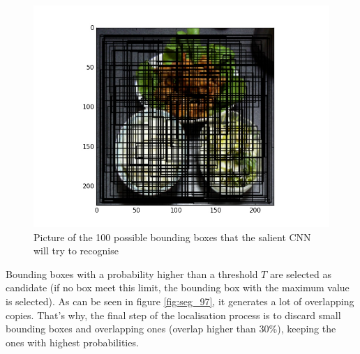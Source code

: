 \begin{figure}
    \centering
    \includegraphics[scale=0.5]{img/seg_100_bboxes.jpg}
    \caption{Picture of the 100 possible bounding boxes that the salient CNN will try to recognise}
    \label{fig:seg_100_bboxes}
\end{figure}

Bounding boxes with a probability higher than a threshold $T$ are selected as candidate (if no box meet this limit, the bounding box with the maximum value is selected). As can be seen in figure \ref{fig:seg_97}, it generates a lot of overlapping copies. That's why, the final step of the localisation process is to discard small bounding boxes and overlapping ones (overlap higher than 30\%), keeping the ones with highest probabilities.


